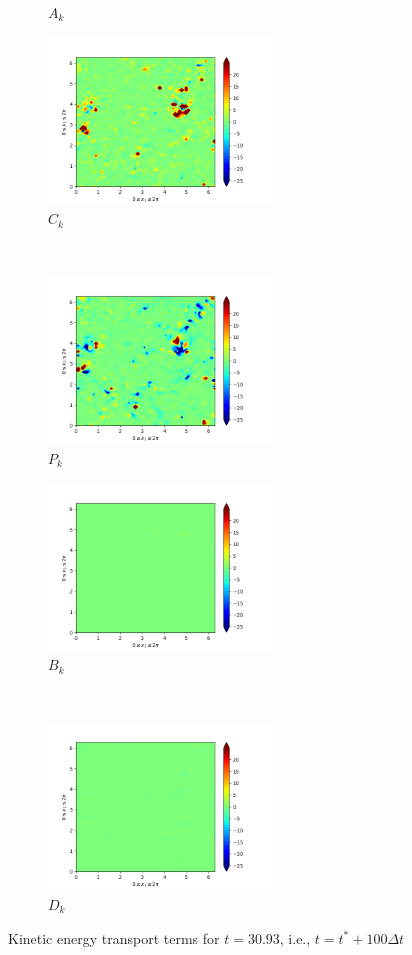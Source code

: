 \begin{figure}[H]
\begin{subfigure}{0.45\textwidth}
        \caption{$A_{k}$}
    \end{subfigure}
    \newline
    \begin{subfigure}{0.45\textwidth}
        \includegraphics[height=1.75in]{media/run-cds-65/C-ke-1440.png}
        \caption{$C_{k}$}
    \end{subfigure}
    ~
    \begin{subfigure}{0.45\textwidth}
        \includegraphics[height=1.75in]{media/run-cds-65/P-ke-1440.png}
        \caption{$P_{k}$}
    \end{subfigure}
    \newline
    \begin{subfigure}{0.45\textwidth}
        \includegraphics[height=1.75in]{media/run-cds-65/B-ke-1440.png}
        \caption{$B_{k}$}
    \end{subfigure}
    ~
    \begin{subfigure}{0.45\textwidth}
        \includegraphics[height=1.75in]{media/run-cds-65/D-ke-1440.png}
        \caption{$D_{k}$}
    \end{subfigure}
    \caption{Kinetic energy transport terms for $t=30.93$, i.e., $t=t^{\ast} + 100 \Delta t$}
\end{figure}

